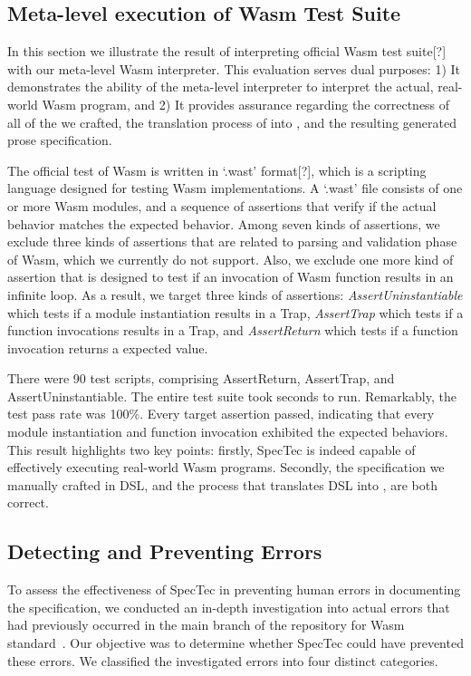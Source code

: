 \subsection{Meta-level execution of Wasm Test Suite}
In this section we illustrate the result of interpreting official Wasm test suite[?]
with our meta-level Wasm interpreter.  This evaluation serves dual purposes: 1) It
demonstrates the ability of the meta-level interpreter to interpret the actual,
real-world Wasm program, and 2) It provides assurance regarding the correctness of
all of the \specdsl we crafted, the translation process of \specdsl into \al,
and the resulting generated prose specification.

The official test of Wasm is written in `.wast' format[?], which is a scripting
language designed for testing Wasm implementations.  A `.wast' file consists of
one or more Wasm modules, and a sequence of assertions that verify if the actual
behavior matches the expected behavior.  Among seven kinds of assertions, we
exclude three kinds of assertions that are related to parsing and validation
phase of Wasm, which we currently do not support.  Also, we exclude one more
kind of assertion that is designed to test if an invocation of Wasm function
results in an infinite loop.  As a result, we target three kinds of assertions:
\textit{AssertUninstantiable} which tests if a module instantiation results in
a Trap, \textit{AssertTrap} which tests if a function invocations results in a
Trap, and \textit{AssertReturn} which tests if a function invocation returns a
expected value.

There were 90 test scripts, comprising  AssertReturn,
 AssertTrap, and  AssertUninstantiable.  The entire test
suite took  seconds to run. Remarkably, the test pass rate was
100\%. Every target assertion passed, indicating that every module instantiation
and function invocation exhibited the expected behaviors.  This result
highlights two key points: firstly, SpecTec is indeed capable of effectively
executing real-world Wasm programs. Secondly, the specification we manually
crafted in DSL, and the process that translates DSL into \al, are both correct.

\subsection{Detecting and Preventing Errors}
To assess the effectiveness of SpecTec in preventing human errors in
documenting the specification, we conducted an in-depth investigation into
actual errors that had previously occurred in the main branch of the repository
for Wasm standard~\cite{wasmspecrepo}. Our objective was to determine whether
SpecTec could have prevented these errors. We classified the investigated
errors into four distinct categories.

